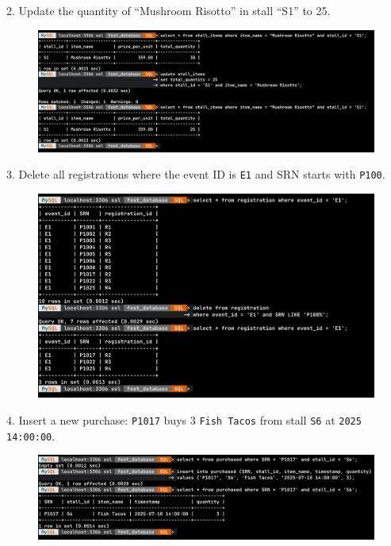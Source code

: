 \documentclass[12pt,a4paper]{article}
\begin{document}
2. Update the quantity of ``Mushroom Risotto'' in stall ``S1'' to 25.

\begin{figure}[H]
    \centering 
    \includegraphics[width=0.9\linewidth]{./images/task1/2.png}
\end{figure}

3. Delete all registrations where the event ID is \texttt{E1} and SRN starts with \texttt{P100}.

\begin{figure}[H]
    \centering 
    \includegraphics[width=0.9\linewidth]{./images/task1/3.png}
\end{figure}

4. Insert a new purchase: \texttt{P1017} buys 3 \texttt{Fish Tacos} from stall \texttt{S6} at \texttt{2025 14:00:00}.

\begin{figure}[H]
    \centering 
    \includegraphics[width=0.9\linewidth]{./images/task1/4.png}
\end{figure}
\end{document}
